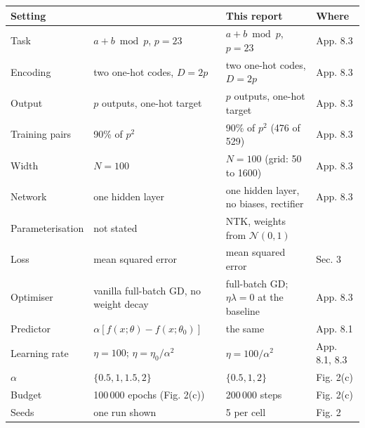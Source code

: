\begin{tabular}{L{2.7cm}L{4.2cm}L{4.5cm}L{1.9cm}}
\toprule
Setting & \citet{kumarGrokkingTransitionLazy2024} & This report & Where \\
\midrule
Task & $a+b \bmod p$, $p=23$ & $a+b \bmod p$, $p=23$ & App. 8.3 \\
Encoding & two one-hot codes, $D=2p$ & two one-hot codes, $D=2p$ & App. 8.3 \\
Output & $p$ outputs, one-hot target & $p$ outputs, one-hot target & App. 8.3 \\
Training pairs & 90\% of $p^2$ & 90\% of $p^2$ (476 of 529) & App. 8.3 \\
Width & $N=100$ & $N=100$ (grid: 50 to 1600) & App. 8.3 \\
Network & one hidden layer & one hidden layer, no biases, rectifier & App. 8.3 \\
Parameterisation & not stated & NTK, weights from $\mathcal{N}(0,1)$ &  \\
Loss & mean squared error & mean squared error & Sec. 3 \\
Optimiser & vanilla full-batch GD, no weight decay & full-batch GD; $\eta\lambda=0$ at the baseline & App. 8.3 \\
Predictor & $\alpha[f(x;\theta)-f(x;\theta_0)]$ & the same & App. 8.1 \\
Learning rate & $\eta=100$; $\eta=\eta_0/\alpha^2$ & $\eta=100/\alpha^2$ & App. 8.1, 8.3 \\
$\alpha$ & $\{0.5,1,1.5,2\}$ & $\{0.5,1,2\}$ & Fig. 2(c) \\
Budget & 100\,000 epochs (Fig. 2(c)) & 200\,000 steps & Fig. 2(c) \\
Seeds & one run shown & 5 per cell & Fig. 2 \\
\bottomrule
\end{tabular}
